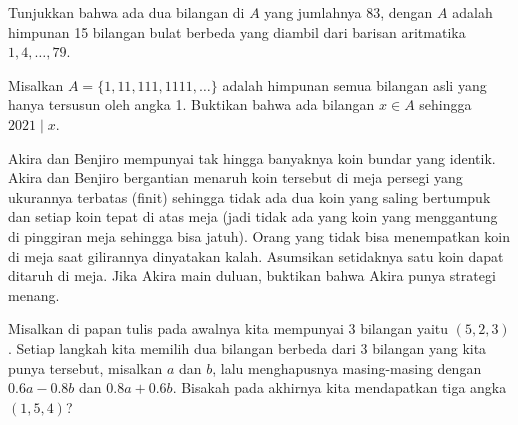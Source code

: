 \documentclass[12pt]{scrartcl}
\begin{document}
	\begin{soalbaru} 
		 Tunjukkan bahwa ada dua bilangan di $A$ yang jumlahnya 83, dengan $A$ adalah himpunan 15 bilangan bulat berbeda yang diambil dari barisan aritmatika $1,4,\dots,79$.
	\end{soalbaru}
	
	\begin{soalbaru} 
		Misalkan $A = \{1,11,111,1111,\dots\}$ adalah himpunan semua bilangan asli yang hanya tersusun oleh angka 1. Buktikan bahwa ada bilangan $x \in A$ sehingga $2021 \mid x$.
	\end{soalbaru}
	
	\begin{soalbaru}
		Akira dan Benjiro mempunyai tak hingga banyaknya koin bundar yang identik. Akira dan Benjiro bergantian menaruh koin tersebut di meja persegi yang ukurannya terbatas (finit) sehingga tidak ada dua koin yang saling bertumpuk dan setiap koin tepat di atas meja (jadi tidak ada yang koin yang menggantung di pinggiran meja sehingga bisa jatuh). Orang yang tidak bisa menempatkan koin di meja saat gilirannya dinyatakan kalah. Asumsikan setidaknya satu koin dapat ditaruh di meja. Jika Akira main duluan, buktikan bahwa Akira punya strategi menang.
	\end{soalbaru}
	
	\begin{soalbaru}
		Misalkan di papan tulis pada awalnya kita mempunyai 3 bilangan yaitu $(5,2,3)$. Setiap langkah kita memilih dua bilangan berbeda dari 3 bilangan yang kita punya tersebut, misalkan $a$ dan $b$, lalu menghapusnya  masing-masing dengan $0.6a-0.8b$ dan $0.8a+0.6b$. Bisakah pada akhirnya kita mendapatkan tiga angka $(1,5,4)$?
	\end{soalbaru}
	
\end{document}

